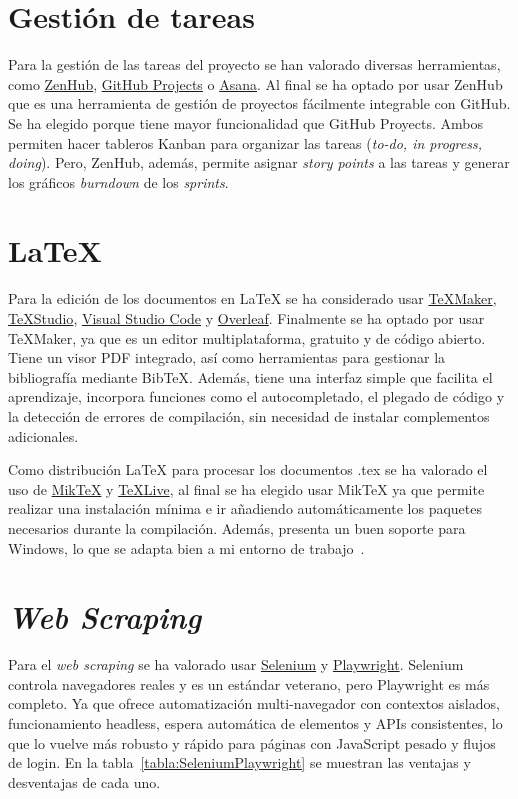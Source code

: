 \section{Gestión de tareas}
Para la gestión de las tareas del proyecto se han valorado diversas herramientas, como \href{https://www.zenhub.com/}{ZenHub}, \href{https://github.com/}{GitHub
  Projects} o \href{https://asana.com/es}{Asana}. Al final se ha optado por usar ZenHub que es una herramienta de gestión de proyectos fácilmente integrable con GitHub. Se ha elegido porque tiene mayor funcionalidad que GitHub Proyects. Ambos permiten hacer tableros Kanban para organizar las tareas (\textit{to-do, in progress, doing}). Pero, ZenHub, además, permite asignar \textit{story points} a las tareas y generar los gráficos \textit{burndown} de los \textit{sprints}.

\section{\LaTeX{}}
Para la edición de los documentos en \LaTeX{} se ha considerado usar \href{http://www.xm1math.net/texmaker/}{\TeX{Maker}}, \href{https://www.texstudio.org/}{\TeX{Studio}}, \href{https://code.visualstudio.com/}{Visual Studio Code} y \href{https://es.overleaf.com/}{Overleaf}. Finalmente se ha optado por usar \TeX{Maker}, ya que es un editor multiplataforma, gratuito y de código abierto. Tiene un visor PDF integrado, así como herramientas para gestionar la bibliografía mediante Bib\TeX{}. Además, tiene una interfaz simple que facilita el aprendizaje, incorpora funciones como el autocompletado, el plegado de código y la detección de errores de compilación, sin necesidad de instalar complementos adicionales.

Como distribución \LaTeX{} para procesar los documentos .tex se ha valorado el uso de \href{https://miktex.org/}{Mik\TeX{}} y \href{https://www.tug.org/texlive/}{\TeX{Live}}, al final se ha elegido usar Mik\TeX{} ya que permite realizar una instalación mínima e ir añadiendo automáticamente los paquetes necesarios durante la compilación. Además, presenta un buen soporte para Windows, lo que se adapta bien a mi entorno de trabajo~\cite{miktex:textlive}.

\section{\textit{Web Scraping}}
Para el \textit{web scraping} se ha valorado usar \href{https://selenium-python.readthedocs.io/}{Selenium} y \href{https://playwright.dev/}{Playwright}.
Selenium controla navegadores reales y es un estándar veterano, pero Playwright es más completo. Ya que ofrece automatización multi-navegador con contextos aislados, funcionamiento headless, espera automática de elementos y APIs consistentes, lo que lo vuelve más robusto y rápido para páginas con JavaScript pesado y flujos de login. En la tabla~\ref{tabla:SeleniumPlaywright} se muestran las ventajas y desventajas de cada uno.


